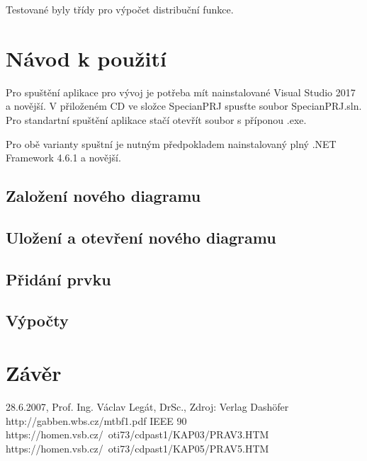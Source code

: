 \documentclass[FM,RP]{tulthesis}
\begin{document}
    Testované byly třídy pro výpočet distribuční funkce.

\chapter{Návod k použití}

    Pro spuštění aplikace pro vývoj je potřeba mít nainstalované Visual Studio 2017 a novější. V přiloženém CD ve složce SpecianPRJ spusťte soubor SpecianPRJ.sln. 
    Pro standartní spuštění aplikace stačí otevřít soubor s příponou .exe.

    Pro obě varianty spuštní je nutným předpokladem nainstalovaný plný .NET Framework 4.6.1 a novější. 

    \section*{Založení nového diagramu}
    \section*{Uložení a otevření nového diagramu}
    \section*{Přidání prvku}
    \section*{Výpočty}

\chapter{Závěr}



\begin{thebibliography}{Mm99}
        28.6.2007, Prof. Ing. Václav Legát, DrSc., Zdroj: Verlag Dashöfer
        http://gabben.wbs.cz/mtbf1.pdf
        IEEE 90
        https://homen.vsb.cz/~oti73/cdpast1/KAP03/PRAV3.HTM
        https://homen.vsb.cz/~oti73/cdpast1/KAP05/PRAV5.HTM
\end{thebibliography}
\end{document}
